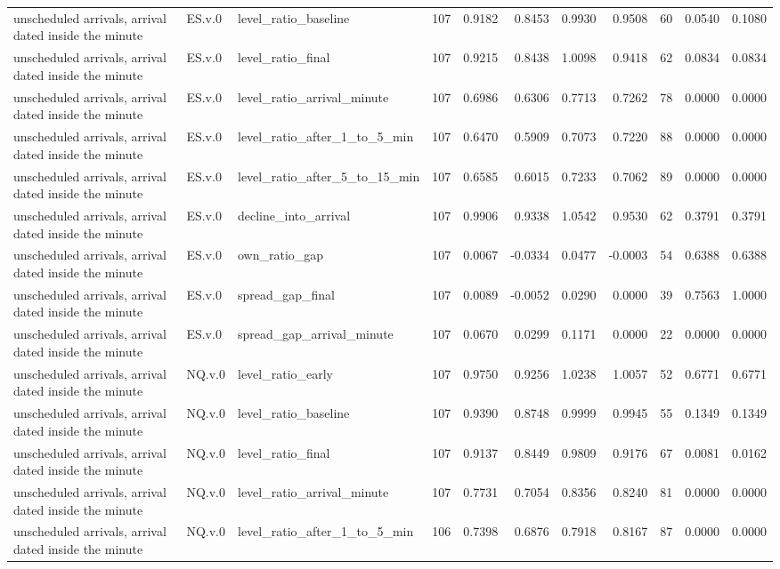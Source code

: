 \begin{tabular}{lllrrrrrrrr}
unscheduled arrivals, arrival dated inside the minute & ES.v.0 & level_ratio_baseline & 107 & 0.9182 & 0.8453 & 0.9930 & 0.9508 & 60 & 0.0540 & 0.1080 \\
unscheduled arrivals, arrival dated inside the minute & ES.v.0 & level_ratio_final & 107 & 0.9215 & 0.8438 & 1.0098 & 0.9418 & 62 & 0.0834 & 0.0834 \\
unscheduled arrivals, arrival dated inside the minute & ES.v.0 & level_ratio_arrival_minute & 107 & 0.6986 & 0.6306 & 0.7713 & 0.7262 & 78 & 0.0000 & 0.0000 \\
unscheduled arrivals, arrival dated inside the minute & ES.v.0 & level_ratio_after_1_to_5_min & 107 & 0.6470 & 0.5909 & 0.7073 & 0.7220 & 88 & 0.0000 & 0.0000 \\
unscheduled arrivals, arrival dated inside the minute & ES.v.0 & level_ratio_after_5_to_15_min & 107 & 0.6585 & 0.6015 & 0.7233 & 0.7062 & 89 & 0.0000 & 0.0000 \\
unscheduled arrivals, arrival dated inside the minute & ES.v.0 & decline_into_arrival & 107 & 0.9906 & 0.9338 & 1.0542 & 0.9530 & 62 & 0.3791 & 0.3791 \\
unscheduled arrivals, arrival dated inside the minute & ES.v.0 & own_ratio_gap & 107 & 0.0067 & -0.0334 & 0.0477 & -0.0003 & 54 & 0.6388 & 0.6388 \\
unscheduled arrivals, arrival dated inside the minute & ES.v.0 & spread_gap_final & 107 & 0.0089 & -0.0052 & 0.0290 & 0.0000 & 39 & 0.7563 & 1.0000 \\
unscheduled arrivals, arrival dated inside the minute & ES.v.0 & spread_gap_arrival_minute & 107 & 0.0670 & 0.0299 & 0.1171 & 0.0000 & 22 & 0.0000 & 0.0000 \\
unscheduled arrivals, arrival dated inside the minute & NQ.v.0 & level_ratio_early & 107 & 0.9750 & 0.9256 & 1.0238 & 1.0057 & 52 & 0.6771 & 0.6771 \\
unscheduled arrivals, arrival dated inside the minute & NQ.v.0 & level_ratio_baseline & 107 & 0.9390 & 0.8748 & 0.9999 & 0.9945 & 55 & 0.1349 & 0.1349 \\
unscheduled arrivals, arrival dated inside the minute & NQ.v.0 & level_ratio_final & 107 & 0.9137 & 0.8449 & 0.9809 & 0.9176 & 67 & 0.0081 & 0.0162 \\
unscheduled arrivals, arrival dated inside the minute & NQ.v.0 & level_ratio_arrival_minute & 107 & 0.7731 & 0.7054 & 0.8356 & 0.8240 & 81 & 0.0000 & 0.0000 \\
unscheduled arrivals, arrival dated inside the minute & NQ.v.0 & level_ratio_after_1_to_5_min & 106 & 0.7398 & 0.6876 & 0.7918 & 0.8167 & 87 & 0.0000 & 0.0000 \\

\end{tabular}
